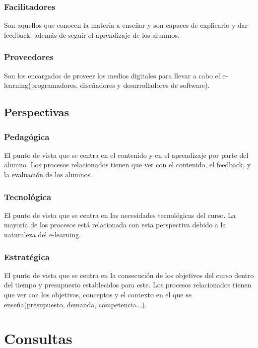 \subsubsection{Facilitadores}
Son aquellos que conocen la materia a enseñar y son capaces de explicarlo y dar feedback, además de seguir el aprendizaje de los alumnos.

\subsubsection{Proveedores}
Son los encargados de proveer los medios digitales para llevar a cabo el e-learning(programadores, diseñadores y desarrolladores de software).

\subsection{Perspectivas}

\subsubsection{Pedagógica}
El punto de vista que se centra en el contenido y en el aprendizaje por parte del alumno. Los procesos relacionados tienen que ver con el contenido, el feedback, y la evaluación de los alumnos.

\subsubsection{Tecnológica}
El punto de vista que se centra en las necesidades tecnológicas del curso. La mayoría de los procesos está relacionada con esta perspectiva debido a la naturaleza del e-learning.

\subsubsection{Estratégica}
El punto de vista que se centra en la consecución de los objetivos del curso dentro del tiempo y presupuesto establecidos para este. Los procesos relacionados tienen que ver con los objetivos, conceptos y el contexto en el que se enseña(presupuesto, demanda, competencia...).


\section{Consultas}
